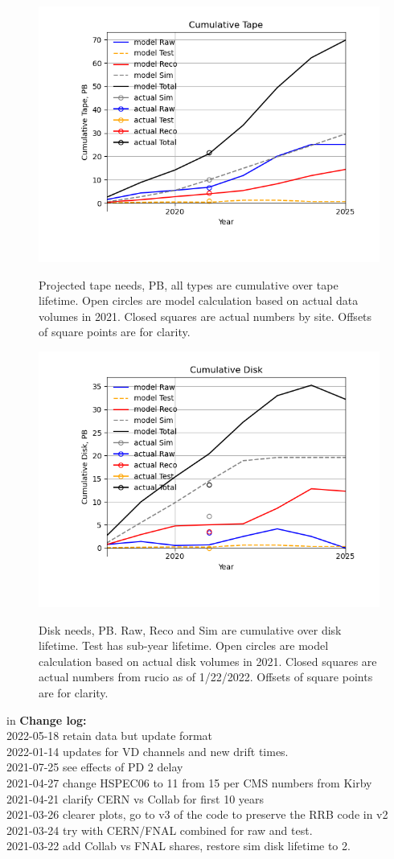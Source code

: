\documentclass[12pt]{article}
\begin{document}
\begin{figure}[h]
\centering\includegraphics[height=0.4\textwidth]{Parameters_2022-01-16-2025-newformat-Cumulative-Tape.png}\label{CumulativeTape}
\caption{Projected  tape needs, PB, all types are cumulative over tape lifetime. Open circles are model calculation based on actual data volumes in 2021. Closed squares are actual numbers by site. Offsets of square points are for clarity.}
\end{figure}
\begin{figure}[h]
\centering\includegraphics[height=0.4\textwidth]{Parameters_2022-01-16-2025-newformat-Cumulative-Disk}\label{CumulativeDisk}
\caption{Disk needs, PB.  Raw, Reco and Sim are cumulative over disk lifetime.  Test has sub-year lifetime.  Open circles are model calculation based on actual disk volumes in 2021. Closed squares are actual numbers from rucio as of 1/22/2022. Offsets of square points are for clarity.}
\end{figure}
 in\pagebreak 
 {\bf Change log:}\\
2022-05-18  retain data but update format\\2022-01-14 updates for VD channels and new drift times.\\2021-07-25 see effects of PD 2 delay\\2021-04-27 change HSPEC06 to 11 from 15 per CMS numbers from Kirby\\2021-04-21 clarify CERN vs Collab for first 10 years\\2021-03-26 clearer plots, go to v3 of the code to preserve the RRB code in v2\\2021-03-24 try with CERN/FNAL combined for raw and test.\\2021-03-22 add Collab vs FNAL shares, restore sim disk lifetime to 2.\\
\end{document}
